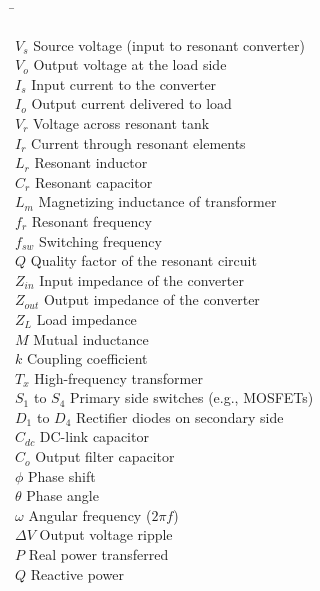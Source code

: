 \documentclass[12pt,a4paper]{report}
\begin{document}
\begin{tabbing}

\hspace{2cm} \= \kill %

 


\vspace{1cm}


$V_{s}$ \> Source voltage (input to resonant converter) \\
$V_{o}$ \> Output voltage at the load side \\
$I_{s}$ \> Input current to the converter \\
$I_{o}$ \> Output current delivered to load \\
$V_{r}$ \> Voltage across resonant tank \\
$I_{r}$ \> Current through resonant elements \\
$L_{r}$ \> Resonant inductor \\
$C_{r}$ \> Resonant capacitor \\
$L_{m}$ \> Magnetizing inductance of transformer \\
$f_{r}$ \> Resonant frequency \\
$f_{sw}$ \> Switching frequency \\
$Q$ \> Quality factor of the resonant circuit \\
$Z_{in}$ \> Input impedance of the converter \\
$Z_{out}$ \> Output impedance of the converter \\
$Z_{L}$ \> Load impedance \\
$M$ \> Mutual inductance \\
$k$ \> Coupling coefficient \\
$T_{x}$ \> High-frequency transformer \\
$S_{1}$ to $S_{4}$ \> Primary side switches (e.g., MOSFETs) \\
$D_{1}$ to $D_{4}$ \> Rectifier diodes on secondary side \\
$C_{dc}$ \> DC-link capacitor \\
$C_{o}$ \> Output filter capacitor \\
$\phi$ \> Phase shift \\
$\theta$ \> Phase angle \\
$\omega$ \> Angular frequency ($2\pi f$) \\
$\Delta V$ \> Output voltage ripple \\
$P$ \> Real power transferred \\
$Q$ \> Reactive power \\

\end{tabbing}
\end{document}
